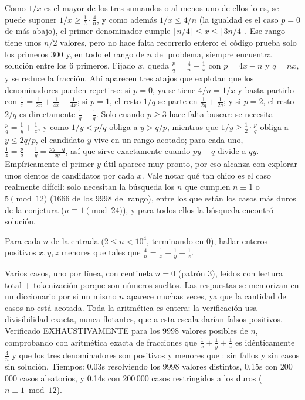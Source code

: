  Como $1/x$ es el mayor de los tres sumandos o al menos uno de ellos lo es, se puede suponer $1/x \ge \frac{1}{3}\cdot\frac{4}{n}$, y como además $1/x \le 4/n$ (la igualdad es el caso $p = 0$ de más abajo), el primer denominador cumple $\lceil n/4 \rceil \le x \le \lfloor 3n/4 \rfloor$. Ese rango tiene unos $n/2$ valores, pero no hace falta recorrerlo entero: el código prueba solo los primeros 300 y, en todo el rango de $n$ del problema, siempre encuentra solución entre los 6 primeros. Fijado $x$, queda $\frac{p}{q} = \frac4n - \frac1x$ con $p = 4x - n$ y $q = nx$, y se reduce la fracción. Ahí aparecen tres atajos que explotan que los denominadores pueden repetirse: si $p = 0$, ya se tiene $4/n = 1/x$ y basta partirlo con $\frac1x = \frac{1}{2x} + \frac{1}{4x} + \frac{1}{4x}$; si $p = 1$, el resto $1/q$ se parte en $\frac{1}{2q} + \frac{1}{2q}$; y si $p = 2$, el resto $2/q$ es directamente $\frac1q + \frac1q$. Solo cuando $p \ge 3$ hace falta buscar: se necesita $\frac{p}{q} = \frac1y + \frac1z$, y como $1/y < p/q$ obliga a $y > q/p$, mientras que $1/y \ge \frac12 \cdot \frac{p}{q}$ obliga a $y \le 2q/p$, el candidato $y$ vive en un rango acotado; para cada uno, $\frac1z = \frac{p}{q} - \frac1y = \frac{py - q}{qy}$, así que sirve exactamente cuando $py - q$ divide a $qy$. Empíricamente el primer $y$ útil aparece muy pronto, por eso alcanza con explorar unos cientos de candidatos por cada $x$. Vale notar qué tan chico es el caso realmente difícil: solo necesitan la búsqueda los $n$ que cumplen $n \equiv 1$ o $5 \pmod{12}$ (1666 de los 9998 del rango), entre los que están los casos más duros de la conjetura ($n \equiv 1 \pmod{24}$), y para todos ellos la búsqueda encontró solución.


Para cada $n$ de la entrada ($2 \le n < 10^4$, terminando en 0), hallar enteros positivos $x, y, z$ menores que  tales que $\frac4n = \frac1x + \frac1y + \frac1z$.

 Varios casos, uno por línea, con centinela $n = 0$ (patrón 3), leídos con lectura total + tokenización porque son números sueltos. Las respuestas se memorizan en un diccionario por si un mismo $n$ aparece muchas veces, ya que la cantidad de casos no está acotada. Toda la aritmética es entera: la verificación usa divisibilidad exacta, nunca flotantes, que a esta escala darían falsos positivos. Verificado EXHAUSTIVAMENTE para los 9998 valores posibles de $n$, comprobando con aritmética exacta de fracciones que $\frac1x+\frac1y+\frac1z$ es idénticamente $\frac4n$ y que los tres denominadores son positivos y menores que : sin fallos y sin casos sin solución. Tiempos: \aprox{}0.03s resolviendo los 9998 valores distintos, \aprox{}0.15s con 200\,000 casos aleatorios, y \aprox{}0.14s con 200\,000 casos restringidos a los duros ($n \equiv 1 \bmod 12$).

